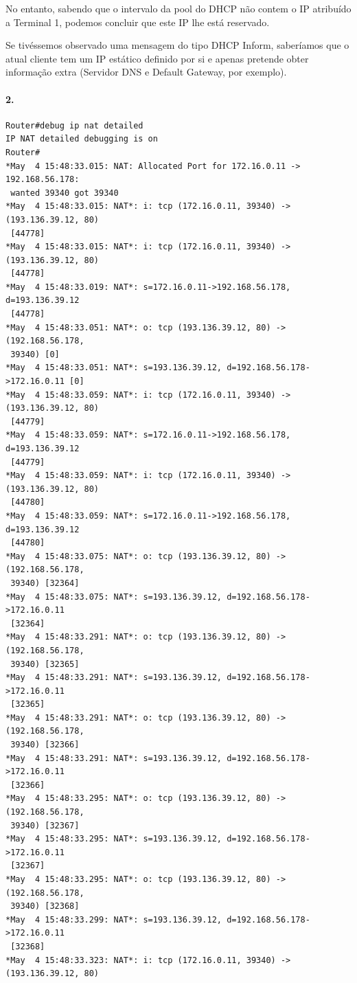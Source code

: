 No entanto, sabendo que o intervalo da \textsf{pool} do DHCP não contem o IP
atribuído a \textsf{Terminal 1}, podemos concluir que este IP lhe está reservado.

Se tivéssemos observado uma mensagem do tipo \textsf{DHCP Inform}, saberíamos que o
atual cliente tem um IP estático definido por si e apenas pretende
obter informação extra (\textsf{Servidor DNS} e \textsf{Default Gateway}, por
exemplo).


\paragraph{2.}

\begin{verbatim}
Router#debug ip nat detailed
IP NAT detailed debugging is on
Router#
*May  4 15:48:33.015: NAT: Allocated Port for 172.16.0.11 -> 192.168.56.178:
 wanted 39340 got 39340
*May  4 15:48:33.015: NAT*: i: tcp (172.16.0.11, 39340) -> (193.136.39.12, 80)
 [44778]
*May  4 15:48:33.015: NAT*: i: tcp (172.16.0.11, 39340) -> (193.136.39.12, 80)
 [44778]
*May  4 15:48:33.019: NAT*: s=172.16.0.11->192.168.56.178, d=193.136.39.12
 [44778]
*May  4 15:48:33.051: NAT*: o: tcp (193.136.39.12, 80) -> (192.168.56.178,
 39340) [0]
*May  4 15:48:33.051: NAT*: s=193.136.39.12, d=192.168.56.178->172.16.0.11 [0]
*May  4 15:48:33.059: NAT*: i: tcp (172.16.0.11, 39340) -> (193.136.39.12, 80)
 [44779]
*May  4 15:48:33.059: NAT*: s=172.16.0.11->192.168.56.178, d=193.136.39.12
 [44779]
*May  4 15:48:33.059: NAT*: i: tcp (172.16.0.11, 39340) -> (193.136.39.12, 80)
 [44780]
*May  4 15:48:33.059: NAT*: s=172.16.0.11->192.168.56.178, d=193.136.39.12
 [44780]
*May  4 15:48:33.075: NAT*: o: tcp (193.136.39.12, 80) -> (192.168.56.178,
 39340) [32364]
*May  4 15:48:33.075: NAT*: s=193.136.39.12, d=192.168.56.178->172.16.0.11
 [32364]
*May  4 15:48:33.291: NAT*: o: tcp (193.136.39.12, 80) -> (192.168.56.178,
 39340) [32365]
*May  4 15:48:33.291: NAT*: s=193.136.39.12, d=192.168.56.178->172.16.0.11
 [32365]
*May  4 15:48:33.291: NAT*: o: tcp (193.136.39.12, 80) -> (192.168.56.178,
 39340) [32366]
*May  4 15:48:33.291: NAT*: s=193.136.39.12, d=192.168.56.178->172.16.0.11
 [32366]
*May  4 15:48:33.295: NAT*: o: tcp (193.136.39.12, 80) -> (192.168.56.178,
 39340) [32367]
*May  4 15:48:33.295: NAT*: s=193.136.39.12, d=192.168.56.178->172.16.0.11
 [32367]
*May  4 15:48:33.295: NAT*: o: tcp (193.136.39.12, 80) -> (192.168.56.178,
 39340) [32368]
*May  4 15:48:33.299: NAT*: s=193.136.39.12, d=192.168.56.178->172.16.0.11
 [32368]
*May  4 15:48:33.323: NAT*: i: tcp (172.16.0.11, 39340) -> (193.136.39.12, 80)

\end{verbatim}
